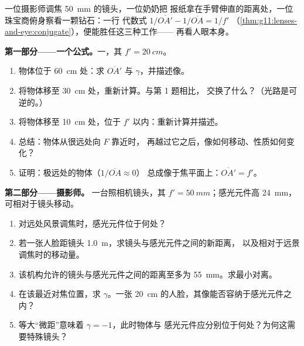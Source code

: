 \begin{problem}
\label{pb:g11:lenses-and-eye:1}
一位摄影师调焦 \qty{50}{mm} 的镜头，一位奶奶把
报纸拿在手臂伸直的距离处，一位珠宝商俯身察看一颗钻石：一行
代数式 $1/\overline{OA'} - 1/\overline{OA} = 1/f'$
（\cref{thm:g11:lenses-and-eye:conjugate}），便能胜任这三种工作——
再看人眼本身。

\medskip
\noindent\textbf{第一部分——一个公式。}一，其
$f' = \qty{20}{cm}$。
\begin{enumerate}
  \item 物体位于 \qty{60}{cm} 处：求 $\overline{OA'}$ 与
        $\gamma$，并描述像。
  \item 将物体移至 \qty{30}{cm} 处，重新计算。与第 1 题相比，
        交换了什么？（光路是可逆的。）
  \item 将物体移至 \qty{10}{cm} 处，位于 $f'$ 以内：重新计算并描述。
  \item 总结：物体从很远处向 $F$ 靠近时，
        再越过它之后，像如何移动、性质如何变化？
  \item 证明：极远处的物体（$1/\overline{OA} \approx 0$）
        总成像于焦平面上：$\overline{OA'} = f'$。
\end{enumerate}

\medskip
\noindent\textbf{第二部分——摄影师。}
一台照相机镜头，其 $f' = \qty{50}{mm}$；感光元件高 \qty{24}{mm}，
可相对于镜头移动。
\begin{enumerate}[resume]
  \item 对远处风景调焦时，感光元件位于何处？
  \item 若一张人脸距镜头 \qty{1.0}{m}，求镜头与感光元件之间的新距离，
        以及相对于远景调焦时的移动量。
  \item 该机构允许的镜头与感光元件之间的距离至多为
        \qty{55}{mm}。求最小对离。
  \item 在该最近对焦位置，求 $\gamma$。一张
        \qty{20}{cm} 的人脸，其像能否容纳于感光元件之内？
  \item 等大“微距”意味着 $\gamma = -1$，此时物体与
        感光元件应分别位于何处？为何这需要特殊镜头？
\end{enumerate}


\end{problem}
